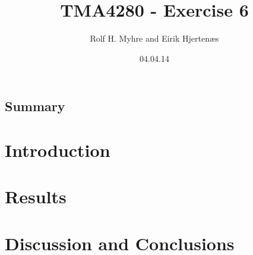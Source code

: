 \documentclass[english,12pt]{article}
\title{\textbf{TMA4280 - Exercise 6}}
\author{Rolf H. Myhre and Eirik Hjertenæs}
\date{04.04.14}
\begin{document}


\renewcommand{\thesubsection}{\alph{subsection}}
\newcommand{\ra}{\ensuremath \rightarrow}

\makeatletter
\renewcommand{\subsection}{\@startsection{subsection}{1}{0mm}{0.5\baselineskip}{0.5 \baselineskip}{\normalfont\normalsize\textbf}}
\renewcommand{\theenumi}{\roman{enumi}}
\renewcommand{\labelenumi}{\theenumi)}
\makeatother


\maketitle


\vspace{1.5cm}
\setcounter{tocdepth}{1}
\setcounter{secnumdepth}{0}
\setcounter{secnumdepth}{2}

\begin{center}
\section*{Summary}
\end{center}

\newpage

\section{Introduction}

\section{Results}

\section{Discussion and Conclusions}


\end{document}

